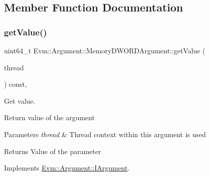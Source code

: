 \subsection{Member Function Documentation}
\mbox{\label{struct_evm_1_1_argument_1_1_memory_d_w_o_r_d_argument_a2236851a43925f9c93db6d107bc5986e}} 
\subsubsection{\texorpdfstring{get\+Value()}{getValue()}}
{\footnotesize\ttfamily uint64\+\_\+t Evm\+::\+Argument\+::\+Memory\+D\+W\+O\+R\+D\+Argument\+::get\+Value (\begin{DoxyParamCaption}\item[{\mbox{\hyperlink{struct_evm_1_1_thread_context}{Thread\+Context}} \&}]{thread }\end{DoxyParamCaption}) const\hspace{0.3cm}{\ttfamily [override]}, {\ttfamily [virtual]}}



Get value. 

Return value of the argument 
\begin{DoxyParams}{Parameters}
{\em thread} & Thread context within this argument is used \\
\hline
\end{DoxyParams}
\begin{DoxyReturn}{Returns}
Value of the parameter 
\end{DoxyReturn}


Implements \mbox{\hyperlink{struct_evm_1_1_argument_1_1_i_argument_af01db10f34498344831877847c2fc038}{Evm\+::\+Argument\+::\+I\+Argument}}.

\mbox{\label{struct_evm_1_1_argument_1_1_memory_d_w_o_r_d_argument_aa65e3072de44a5261193fdcfa2babc11}} 
